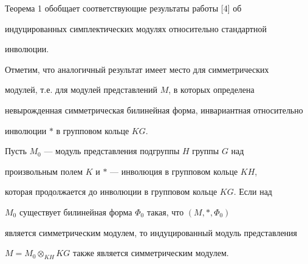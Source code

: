 




Теорема 1 обобщает соответствующие результаты работы [4] об


индуцированных симплектических модулях относительно стандартной


инволюции.





Отметим, что аналогичный результат имеет место для симметрических


модулей, т.е. для модулей представлений $M$, в которых определена


невырожденная симметрическая билинейная форма, инвариантная относительно


инволюции $*$ в групповом кольце $KG$.





Пусть $M_0$ --- модуль представления подгруппы $H$ группы $G$ над


произвольным полем $K$ и $*$ --- инволюция в групповом кольце $KH$,


которая продолжается до инволюции в групповом кольце $KG$. Если над


$M_0$ существует билинейная форма $\Phi_0$ такая, что $(M,*,\Phi_0)$


является симметрическим модулем, то индуцированный модуль представления


$M=M_0\otimes_{KH}KG$ также является симметрическим модулем.





